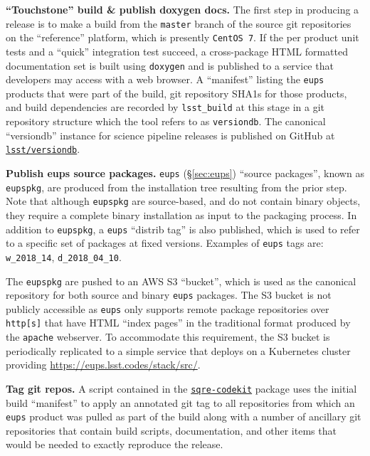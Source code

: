 \noindent \textbf{``Touchstone'' build \& publish doxygen docs.}
The first step in producing a release is to make a build from the
\texttt{master} branch of the source git repositories on the ``reference''
platform, which is presently \texttt{CentOS~7}.  If the per product unit tests
and a ``quick'' integration test succeed, a cross-package HTML
formatted documentation set is built using \texttt{doxygen}\cite{doxygen} and is published to
a service that developers may access with a web browser.
A ``manifest'' listing the \texttt{eups} products that were part of the build,
git repository SHA1s for those products, and build dependencies are recorded by
\texttt{lsst\_build} at this stage in a git repository structure which the tool
refers to as \texttt{versiondb}.  The canonical ``versiondb'' instance for science
pipeline releases is published on GitHub at
\href{https://github.com/lsst/versiondb}{\texttt{lsst/versiondb}}.

\noindent \textbf{Publish eups source packages.}
\label{sec:scipipe-deploy-src}
\texttt{eups} (\S\ref{sec:eups}) ``source packages'', known as \texttt{eupspkg}, are
produced from the installation tree resulting from the prior step.  Note that
although \texttt{eupspkg} are source-based, and do not contain binary objects,
they require a complete binary installation as input to the packaging process.
In addition to \texttt{eupspkg}, a \texttt{eups} ``distrib tag'' is also
published, which is used to refer to a specific set of packages at fixed
versions.  Examples of \texttt{eups} tags are: \texttt{w\_2018\_14}, \texttt{d\_2018\_04\_10}.

The \texttt{eupspkg} are pushed to an AWS S3 ``bucket'', which is used as the
canonical repository for both source and binary \texttt{eups} packages.  The S3
bucket is not publicly accessible as \texttt{eups} only supports remote
package repositories over \texttt{http[s]} that have HTML ``index
pages'' in the traditional format produced by the \texttt{apache}
webserver.  To accommodate this
requirement, the S3 bucket is periodically replicated to a simple
service that deploys on a Kubernetes cluster providing \url{https://eups.lsst.codes/stack/src/}.

\noindent \textbf{Tag git repos.}
A script contained in the
\href{https://github.com/lsst-sqre/sqre-codekit}{\texttt{sqre-codekit}} package
uses the initial build ``manifest'' to apply an annotated git tag to all
repositories from which an \texttt{eups} product was pulled as part of the
build along with a number of ancillary git repositories that contain build
scripts, documentation, and other items that would be needed to exactly reproduce the
release.

